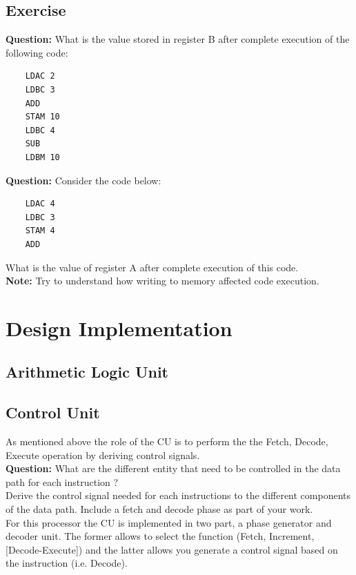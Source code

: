 \documentclass[a4paper, 11pt]{article}
\begin{document}
\subsection{Exercise}

\textbf{Question:} What is the value stored in register B after complete execution of the following code:
\begin{lstlisting}
    LDAC 2
    LDBC 3
    ADD
    STAM 10
    LDBC 4
    SUB
    LDBM 10
\end{lstlisting}
\textbf{Question:} Consider the code below:
\begin{lstlisting}
    LDAC 4
    LDBC 3
    STAM 4
    ADD
\end{lstlisting}
What is the value of register A after complete execution of this code.\\
\textbf{Note:} Try to understand how writing to memory affected code execution.
\section{Design Implementation}
\subsection{Arithmetic Logic Unit}
\subsection{Control Unit}
As mentioned above the role of the CU is to perform the the Fetch, Decode, Execute operation by deriving control signals. \\
\textbf{Question:} What are the different entity that need to be controlled in the data path for each instruction ? \\ 
Derive the control signal needed for each instructions to the different components of the data path. Include a fetch and decode phase as part of your work. \\
For this processor the CU is implemented in two part, a phase generator and decoder unit. The former allows to select the function (Fetch, Increment, [Decode-Execute]) and the latter allows you generate a control signal based on the instruction (i.e. Decode).
\end{document}
